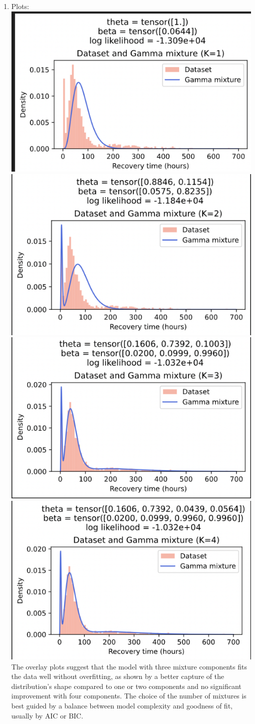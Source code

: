 \documentclass[submit]{harvardml}
\begin{document}
\begin{enumerate}
\begin{python}
def run_em(theta, betas, iterations=1000):
   for _ in range(iterations):
        q = e_step(theta, betas)
        theta, betas = m_step(q)
    return theta, betas
    \end{python}
  \item Plots: \includegraphics[width=0.5\linewidth]{hw5/2.png} \includegraphics[width=0.5\linewidth]{hw5/3.png} \includegraphics[width=0.5\linewidth]{hw5/4.png} \includegraphics[width=0.5\linewidth]{hw5/5.png}
  The overlay plots suggest that the model with three mixture components fits the data well without overfitting, as shown by a better capture of the distribution's shape compared to one or two components and no significant improvement with four components. The choice of the number of mixtures is best guided by a balance between model complexity and goodness of fit, usually by AIC or BIC.

\end{enumerate}
\end{document}
